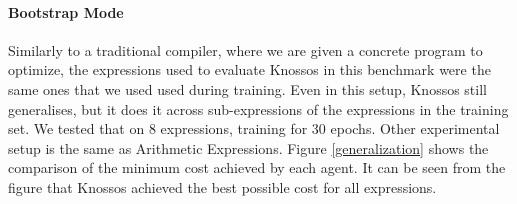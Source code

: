 \documentclass[fullpage,twocolumn]{article} %
\begin{document}



\paragraph{Bootstrap Mode}
Similarly to a traditional compiler, where we are given a concrete program to optimize, the expressions used to evaluate Knossos in this benchmark were the same ones that we used used during training. Even in this setup, Knossos still generalises, but it does it across sub-expressions of the expressions in the training set. 
We tested that on 8 expressions, training for 30 epochs. Other experimental setup is the same as Arithmetic Expressions.
Figure \ref{generalization} shows the comparison of the minimum cost achieved by each agent.
It can be seen from the figure that Knossos achieved the best possible cost for all expressions.
\end{document}
